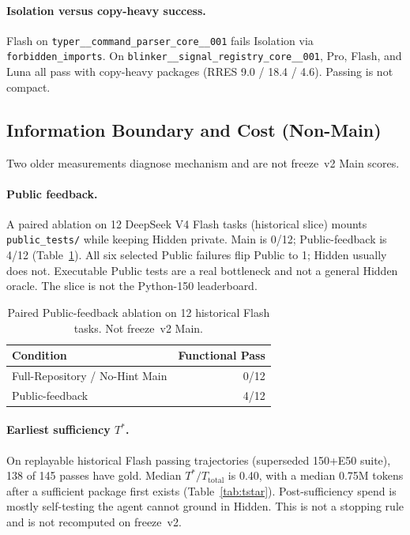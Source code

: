 \paragraph{Isolation versus copy-heavy success.}
Flash on \texttt{typer\_\_command\_parser\_core\_\_001} fails Isolation via
\texttt{forbidden\_imports}. On \texttt{blinker\_\_signal\_registry\_core\_\_001},
Pro, Flash, and Luna all pass with copy-heavy packages (RRES 9.0 / 18.4 /
4.6). Passing is not compact.

\subsection{Information Boundary and Cost (Non-Main)}
\label{sec:nonmain}

Two older measurements diagnose mechanism and are not freeze~v2 Main scores.

\paragraph{Public feedback.}
A paired ablation on 12 DeepSeek V4 Flash tasks (historical slice) mounts
\texttt{public\_tests/} while keeping Hidden private. Main is 0/12;
Public-feedback is 4/12 (Table~\ref{tab:public-feedback}). All six selected
Public failures flip Public to 1; Hidden usually does not. Executable Public
tests are a real bottleneck and not a general Hidden oracle. The slice is not
the Python-150 leaderboard.

\begin{table}[t]
  \caption{Paired Public-feedback ablation on 12 historical Flash tasks.
  Not freeze~v2 Main.}
  \label{tab:public-feedback}
  \centering
  \begin{tabular}{lr}
    \toprule
    \textbf{Condition} & \textbf{Functional Pass} \\
    \midrule
    Full-Repository / No-Hint Main & 0/12 \\
    Public-feedback & 4/12 \\
    \bottomrule
  \end{tabular}
\end{table}

\paragraph{Earliest sufficiency $T^*$.}
On replayable historical Flash passing trajectories (superseded 150+E50
suite), 138 of 145 passes have gold. Median $T^*/T_{\mathrm{total}}$ is 0.40,
with a median 0.75M tokens after a sufficient package first exists
(Table~\ref{tab:tstar}). Post-sufficiency spend is mostly self-testing the
agent cannot ground in Hidden. This is not a stopping rule and is not
recomputed on freeze~v2.

